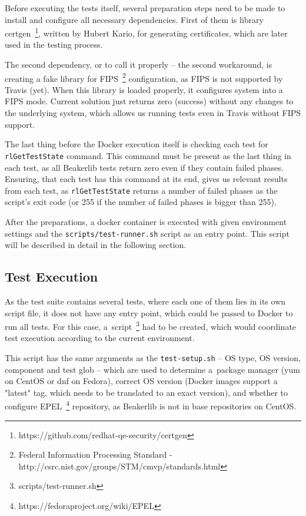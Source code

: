     Before executing the tests itself, several preparation steps need to be made
    to install and configure all necessary dependencies. First of them is
    library certgen~\footnote{https://github.com/redhat-qe-security/certgen},
    written by Hubert Kario, for generating certificates, which are later used
    in the testing process.

    The second dependency, or to call it properly -- the second workaround, is
    creating a fake library for
    FIPS~\footnote{Federal Information Processing Standard - http://csrc.nist.gov/groups/STM/cmvp/standards.html}
    configuration, as FIPS is not supported
    by Travis (yet). When this library is loaded properly, it configures
    system into a FIPS mode. Current solution just returns zero (success) without
    any changes to the underlying system, which allows us running tests even in
    Travis without FIPS support.

    The last thing before the Docker execution itself is checking each test
    for \texttt{rlGetTestState} command. This command must be present as
    the last thing in each test, as all Beakerlib tests return zero even
    if they contain failed phases. Ensuring, that each test has this command
    at its end, gives us relevant results from each test, as
    \texttt{rlGetTestState} returns a number of failed phases as the script's
    exit code (or 255 if the number of failed phases is bigger than 255).

    After the preparations, a docker container is executed with given environment
    settings and the \texttt{scripts/test-runner.sh} script as an entry point.
    This script will be described in detail in the following section.

\subsection{Test Execution}
    As the test suite contains several tests, where each one of them lies in
    its own script file, it does not have any entry point, which could be passed
    to Docker to run all tests. For this case,
    a~script~\footnote{scripts/test-runner.sh} had to be created,
    which would coordinate test execution according to the current environment.

    This script has the same arguments as the \texttt{test-setup.sh} -- OS type,
    OS version, component and test glob -- which are used to determine
    a~package manager (yum on CentOS or dnf on Fedora), correct OS version
    (Docker images support a "latest" tag, which needs to be translated to
    an exact version), and whether to configure
    EPEL~\footnote{https://fedoraproject.org/wiki/EPEL} repository, as Beakerlib
    is not in base repositories on CentOS.

